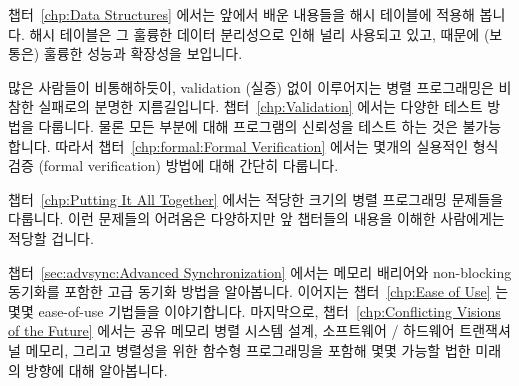 챕터~\ref{chp:Data Structures} 에서는 앞에서 배운 내용들을 해시 테이블에 적용해
봅니다. 해시 테이블은 그 훌륭한 데이터 분리성으로 인해 널리 사용되고 있고,
때문에 (보통은) 훌륭한 성능과 확장성을 보입니다.


많은 사람들이 비통해하듯이, validation (실증) 없이 이루어지는 병렬 프로그래밍은
비참한 실패로의 분명한 지름길입니다.
챕터~\ref{chp:Validation} 에서는 다양한 테스트 방법을 다룹니다.
물론 모든 부분에 대해 프로그램의 신뢰성을 테스트 하는 것은 불가능합니다.
따라서 챕터~\ref{chp:formal:Formal Verification} 에서는 몇개의 실용적인 형식
검증 (formal verification) 방법에 대해 간단히 다룹니다.


챕터~\ref{chp:Putting It All Together} 에서는 적당한 크기의 병렬 프로그래밍
문제들을 다룹니다.
이런 문제들의 어려움은 다양하지만 앞 챕터들의 내용을 이해한 사람에게는 적당할
겁니다.


챕터~\ref{sec:advsync:Advanced Synchronization} 에서는 메모리 배리어와
non-blocking 동기화를 포함한 고급 동기화 방법을 알아봅니다.
이어지는 챕터~\ref{chp:Ease of Use} 는 몇몇 ease-of-use 기법들을 이야기합니다.
마지막으로, 챕터~\ref{chp:Conflicting Visions of the Future} 에서는 공유 메모리
병렬 시스템 설계, 소프트웨어 / 하드웨어 트랜잭셔널 메모리, 그리고 병렬성을 위한
함수형 프로그래밍을 포함해 몇몇 가능할 법한 미래의 방향에 대해 알아봅니다.


